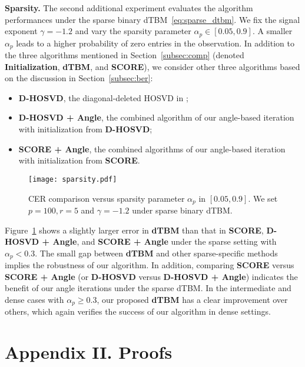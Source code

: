 \documentclass[lettersize,onecolumn,journal]{IEEEtran}
\theoremstyle{definition}
\theoremstyle{definition}
\begin{document}
{{\bf Sparsity.} The second additional experiment evaluates the algorithm performances under the sparse binary dTBM~\eqref{eq:sparse_dtbm}. We fix the signal exponent $\gamma = -1.2$ and vary the sparsity parameter $\alpha_p \in [0.05, 0.9]$. A smaller $\alpha_p$ leads to a higher probability of zero entries in the observation. In addition to the three algorithms mentioned in Section~\ref{subsec:comp} (denoted {\bf \small Initialization}, {\bf \small dTBM}, and {\bf \small SCORE}), we consider other three algorithms based on the discussion in Section~\ref{subsec:ber}: 
  \begin{itemize} 
  \item \textbf{\small D-HOSVD}, the diagonal-deleted HOSVD in \cite{ke2019community}; 
  \item \textbf{\small D-HOSVD + Angle}, the combined algorithm of our angle-based iteration with initialization from \textbf{\small D-HOSVD};
  \item \textbf{\small SCORE + Angle}, the combined algorithms of our angle-based iteration with initialization from \textbf{\small SCORE}.
  \end{itemize}


\begin{figure}[htp!]
    \centering
    \texttt{[image: sparsity.pdf]}
    \caption{CER comparison versus sparsity parameter $\alpha_p$ in $[0.05, 0.9]$. We set $p = 100, r = 5$ and $\gamma = -1.2$ under sparse binary dTBM.}
    \label{fig:sparse}
\end{figure}

  
Figure~\ref{fig:sparse} shows a slightly larger error in \textbf{\small dTBM} than that in \textbf{\small SCORE}, \textbf{\small D-HOSVD + Angle}, and \textbf{\small SCORE + Angle} under the sparse setting with $\alpha_p < 0.3$. 
The small gap between  \textbf{\small dTBM} and other sparse-specific methods implies the robustness of our algorithm. In addition, comparing \textbf{\small SCORE} versus \textbf{\small SCORE + Angle} (or \textbf{\small D-HOSVD} versus \textbf{\small D-HOSVD + Angle}) indicates the benefit of our angle iterations under the sparse dTBM. In the intermediate and dense cases with $\alpha_p \geq 0.3$, our proposed \textbf{\small dTBM} has a clear improvement over others, which again verifies the success of our algorithm in dense settings.


}

\section*{Appendix II. Proofs}
\end{document}
